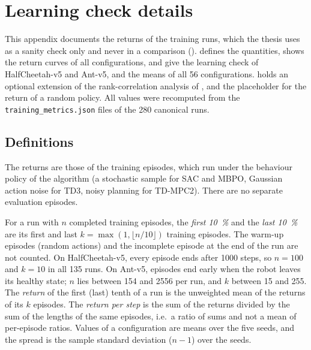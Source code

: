 \chapter{Learning check details}
\label{app:learning}

This appendix documents the returns of the training runs, which the thesis uses as a sanity check only and never in a comparison ().
 defines the quantities,  shows the return curves of all configurations,  and  give the learning check of HalfCheetah-v5 and Ant-v5, and  the means of all \num{56} configurations.
 holds an optional extension of the rank-correlation analysis of , and  the placeholder for the return of a random policy.
All values were recomputed from the \texttt{training\_metrics.json} files of the \num{280} canonical runs.

\section{Definitions}\label{sec:app-learn-def}

The returns are those of the training episodes, which run under the behaviour policy of the algorithm (a stochastic sample for SAC and MBPO, Gaussian action noise for TD3, noisy planning for TD-MPC2).
There are no separate evaluation episodes.

For a run with $n$ completed training episodes, the \emph{first \SI{10}{\percent}} and the \emph{last \SI{10}{\percent}} are its first and last $k=\max(1,\lfloor n/10\rfloor)$ training episodes.
The warm-up episodes (random actions) and the incomplete episode at the end of the run are not counted.
On HalfCheetah-v5, every episode ends after \num{1000} steps, so $n=\num{100}$ and $k=\num{10}$ in all \num{135} runs.
On Ant-v5, episodes end early when the robot leaves its healthy state; $n$ lies between \num{154} and \num{2556} per run, and $k$ between \num{15} and \num{255}.
The \emph{return} of the first (last) tenth of a run is the unweighted mean of the returns of its $k$ episodes.
The \emph{return per step} is the sum of the returns divided by the sum of the lengths of the same episodes, i.e.\ a ratio of sums and not a mean of per-episode ratios.
Values of a configuration are means over the five seeds, and the spread is the sample standard deviation ($n-1$) over the seeds.

